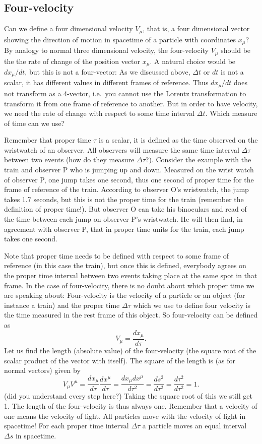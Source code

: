 {\begin{multicols}{2}
\section{Four-velocity}
\label{sect:fourvel}

Can we define a four dimensional velocity $V_\mu$, that is, a four dimensional vector showing the direction of motion in spacetime of a particle with coordinates $x_\mu$? By analogy to normal three dimensional velocity, the four-velocity $V_\mu$ should be the the rate of change of the position vector $x_\mu$. A natural choice would be $dx_\mu/dt$, but this is not a four-vector: As we discussed above, $\Delta t$ or $dt$ is not a scalar, it has different values in different frames of reference. Thus $dx_\mu/dt$ does not transform as a 4-vector, i.e.\ you cannot use the Lorentz transformation to transform it from one frame of reference to another. But in order to have velocity, we need the rate of change with respect to some time interval $\Delta t$. Which measure of time can we use?

Remember that proper time $\tau$ is a scalar, it is defined as the time observed on the wristwatch of an observer. All observers will measure the same time interval $\Delta\tau$ between two events (how do they measure $\Delta\tau$?). Consider the example with the train and observer P who is jumping up and down. Measured on the wrist watch of observer P, one jump takes one second, thus one second of proper time for the frame of reference of the train. According to observer O's wristwatch, the jump takes 1.7 seconds, but this is not the proper time for the train (remember the definition of proper time!). But observer O can take his binoculars and read of the time between each jump on observer P's wristwatch. He will then find, in agreement with observer P, that in proper time units for the train, each jump takes one second. 

Note that proper time needs to be defined with respect to some frame of reference (in this case the train), but once this is defined, everybody agrees on the proper time interval between two events taking place at the same spot in that frame. In the case of four-velocity, there is no doubt about which proper time we are speaking about: Four-velocity is the velocity of a particle or an object (for instance a train) and the proper time $\Delta\tau$ which we use to define four velocity is the time measured in the rest frame of this object. So four-velocity\label{pg:fourvelocity} can be defined as
\[
V_\mu=\frac{dx_\mu}{d\tau}.
\]
Let us find the length (absolute value) of the four-velocity (the square root of the scalar product of the vector with itself). The square of the length is (as for normal vectors) given by
\[
V_\mu V^\mu=\frac{dx_\mu}{d\tau}\frac{dx^\mu}{d\tau}=\frac{dx_\mu dx^\mu}{d\tau^2}=\frac{ds^2}{d\tau^2}=\frac{d\tau^2}{d\tau^2}=1.
\]
(did you understand every step here?)
Taking the square root of this we still get 1. The length of the four-velocity is thus always one. Remember that a velocity of one means the velocity of light. All particles move with the velocity of light in spacetime! For each proper time interval $\Delta\tau$ a particle moves an equal interval $\Delta s$ in spacetime.


\end{multicols}}
